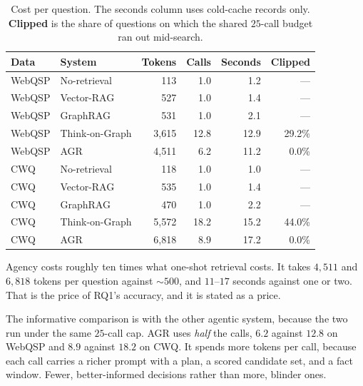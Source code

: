 \begin{table}[!tb]
  \begin{center}
    \caption[Cost per question]{Cost per question. The seconds column uses
    cold-cache records only. \textbf{Clipped} is the share of questions on which
    the shared $25$-call budget ran out mid-search.}
    \label{tab:efficiency}
    \small
    \begin{tabular}{|l|l|r|r|r|r|}
      \hline
      \textbf{Data} & \textbf{System} & \textbf{Tokens} & \textbf{Calls} &
      \textbf{Seconds} & \textbf{Clipped} \\
      \hline
      WebQSP & No-retrieval   & 113   & 1.0  & 1.2  & --- \\
      WebQSP & Vector-RAG     & 527   & 1.0  & 1.4  & --- \\
      WebQSP & GraphRAG       & 531   & 1.0  & 2.1  & --- \\
      WebQSP & Think-on-Graph & 3{,}615 & 12.8 & 12.9 & 29.2\% \\
      WebQSP & AGR            & 4{,}511 & 6.2  & 11.2 & 0.0\% \\
      \hline
      CWQ & No-retrieval   & 118   & 1.0  & 1.0  & --- \\
      CWQ & Vector-RAG     & 535   & 1.0  & 1.4  & --- \\
      CWQ & GraphRAG       & 470   & 1.0  & 2.2  & --- \\
      CWQ & Think-on-Graph & 5{,}572 & 18.2 & 15.2 & 44.0\% \\
      CWQ & AGR            & 6{,}818 & 8.9  & 17.2 & 0.0\% \\
      \hline
    \end{tabular}
  \end{center}
\end{table}

Agency costs roughly ten times what one-shot retrieval costs. It takes $4{,}511$
and $6{,}818$ tokens per question against $\sim 500$, and
$11$--$17$ seconds against one or two. That is the price of RQ1's accuracy, and
it is stated as a price.

The informative comparison is with the other agentic system, because the two run
under the same $25$-call cap. AGR uses \emph{half} the calls, $6.2$ against
$12.8$ on WebQSP and $8.9$ against $18.2$ on CWQ. It spends more tokens per
call, because each call carries a richer prompt with a plan, a scored candidate
set, and a fact window. Fewer, better-informed decisions rather than more,
blinder ones.

